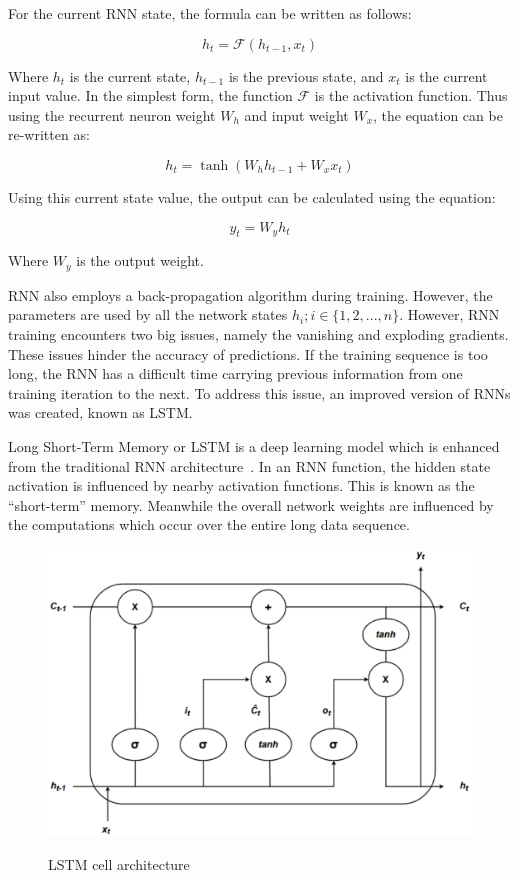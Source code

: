For the current RNN state, the formula can be written as follows:

\begin{equation}
    h_{t} = \mathcal{F}(h_{t-1}, x_{t})
\end{equation}

Where $h_{t}$ is the current state, $h_{t-1}$ is the previous state, and $x_{t}$ is the current input value. In the simplest form, the function $\mathcal{F}$ is the activation function. Thus using the recurrent neuron weight $W_{h}$ and input weight $W_{x}$, the equation can be re-written as:

\begin{equation}
    h_{t} = \tanh(W_{h}h_{t-1} + W_{x}x_{t})
\end{equation}

Using this current state value, the output can be calculated using the equation:

\begin{equation}
    y_{t} = W_{y}h_{t}
\end{equation}

Where $W_{y}$ is the output weight.\par

RNN also employs a back-propagation algorithm during training. However, the parameters are used by all the network states $h_{i}; i \in \{1, 2, ... , n\}$. However, RNN training encounters two big issues, namely the vanishing and exploding gradients. These issues hinder the accuracy of predictions. If the training sequence is too long, the RNN has a difficult time carrying previous information from one training iteration to the next. To address this issue, an improved version of RNNs was created, known as LSTM.\par

Long Short-Term Memory or LSTM is a deep learning model which is enhanced from the traditional RNN architecture~\cite{lindemann2021survey}. In an RNN function, the hidden state activation is influenced by nearby activation functions. This is known as the ``short-term'' memory. Meanwhile the overall network weights are influenced by the computations which occur over the entire long data sequence.\par

\begin{figure}[htb]
    \centering
    \caption{LSTM cell architecture}
    \includegraphics[width=0.8\linewidth]{Figures/LSTM-Cell-Architecture.pdf}
    \label{fig:lstm-cell-architecture}
\end{figure}

